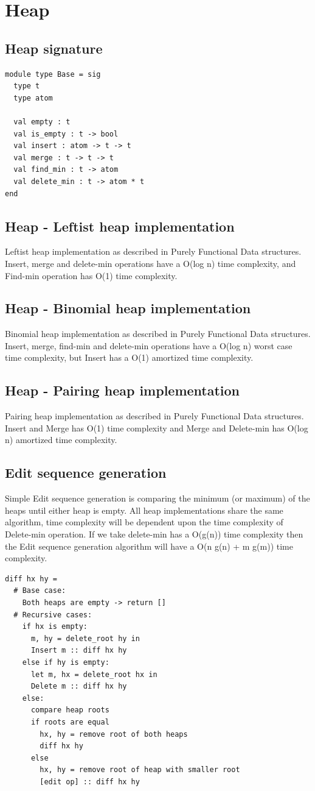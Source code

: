 \documentclass{article}
\begin{document}
\newpage
\section{Heap}
\subsection{Heap signature}
\begin{lstlisting}
module type Base = sig
  type t
  type atom

  val empty : t
  val is_empty : t -> bool
  val insert : atom -> t -> t
  val merge : t -> t -> t
  val find_min : t -> atom 
  val delete_min : t -> atom * t
end
\end{lstlisting}

\subsection{Heap - Leftist heap implementation}
Leftist heap implementation as described in Purely Functional Data structures\cite{okasaki}. Insert, merge and delete-min operations have a O(log n) time complexity, and Find-min operation has O(1) time complexity.

\subsection{Heap - Binomial heap implementation}
Binomial heap implementation as described in Purely Functional Data structures\cite{okasaki}. Insert, merge, find-min and delete-min operations have a O(log n) worst case time complexity, but Insert has a O(1) amortized time complexity.

\subsection{Heap - Pairing heap implementation}
Pairing heap implementation as described in Purely Functional Data structures\cite{okasaki}. Insert and Merge has O(1) time complexity and Merge and Delete-min has O(log n) amortized time complexity.

\subsection{Edit sequence generation}
Simple Edit sequence generation is comparing the minimum (or maximum) of the heaps until either heap is empty. All heap implementations share the same algorithm, time complexity will be dependent upon the time complexity of Delete-min operation. If we take delete-min has a O(g(n)) time complexity then the Edit sequence generation algorithm will have a O(n g(n) + m g(m)) time complexity.
\begin{lstlisting}
diff hx hy =
  # Base case:
  	Both heaps are empty -> return []
  # Recursive cases:
  	if hx is empty:
      m, hy = delete_root hy in
      Insert m :: diff hx hy
  	else if hy is empty:
      let m, hx = delete_root hx in
      Delete m :: diff hx hy
  	else:
      compare heap roots
      if roots are equal
      	hx, hy = remove root of both heaps
        diff hx hy
      else
      	hx, hy = remove root of heap with smaller root
        [edit op] :: diff hx hy
\end{lstlisting}
\end{document}
